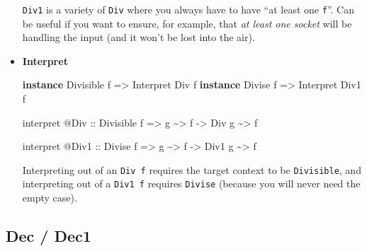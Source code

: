 \documentclass[]{article}
\newenvironment{Shaded}{}{}
\newcommand{\DataTypeTok}[1]{\textcolor[rgb]{0.56,0.13,0.00}{#1}}
\newcommand{\KeywordTok}[1]{\textcolor[rgb]{0.00,0.44,0.13}{\textbf{#1}}}
\newcommand{\NormalTok}[1]{#1}
\newcommand{\OperatorTok}[1]{\textcolor[rgb]{0.40,0.40,0.40}{#1}}
\newcommand{\OtherTok}[1]{\textcolor[rgb]{0.00,0.44,0.13}{#1}}
\begin{document}
\begin{itemize}
  \texttt{Div1} is a variety of \texttt{Div} where you always have to have ``at
  least one \texttt{f}''. Can be useful if you want to ensure, for example, that
  \emph{at least one socket} will be handling the input (and it won't be lost
  into the air).
\item
  \textbf{Interpret}

\begin{Shaded}
\begin{Highlighting}[]
\KeywordTok{instance} \DataTypeTok{Divisible}\NormalTok{ f }\OtherTok{=>} \DataTypeTok{Interpret} \DataTypeTok{Div}\NormalTok{  f}
\KeywordTok{instance} \DataTypeTok{Divise}\NormalTok{    f }\OtherTok{=>} \DataTypeTok{Interpret} \DataTypeTok{Div1}\NormalTok{ f}

\NormalTok{interpret }\OperatorTok{@}\DataTypeTok{Div}
\OtherTok{    ::} \DataTypeTok{Divisible}\NormalTok{ f}
    \OtherTok{=>}\NormalTok{ g }\OperatorTok{\textasciitilde{}>}\NormalTok{ f}
    \OtherTok{{-}>} \DataTypeTok{Div}\NormalTok{ g }\OperatorTok{\textasciitilde{}>}\NormalTok{ f}

\NormalTok{interpret }\OperatorTok{@}\DataTypeTok{Div1}
\OtherTok{    ::} \DataTypeTok{Divise}\NormalTok{ f}
    \OtherTok{=>}\NormalTok{ g }\OperatorTok{\textasciitilde{}>}\NormalTok{ f}
    \OtherTok{{-}>} \DataTypeTok{Div1}\NormalTok{ g }\OperatorTok{\textasciitilde{}>}\NormalTok{ f}
\end{Highlighting}
\end{Shaded}

  Interpreting out of an \texttt{Div\ f} requires the target context to be
  \texttt{Divisible}, and interpreting out of a \texttt{Div1\ f} requires
  \texttt{Divise} (because you will never need the empty case).
\end{itemize}

\hypertarget{dec-dec1}{%
\subsection{Dec / Dec1}\label{dec-dec1}}
\end{document}
